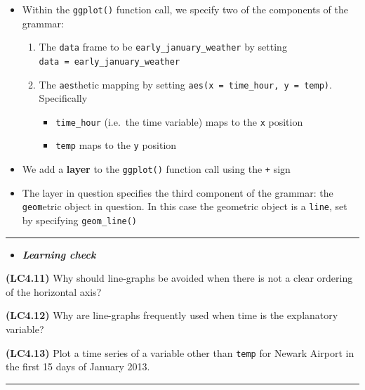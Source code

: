\documentclass[]{tufte-book}
\let\oldrule=\rule
\renewcommand{\rule}[1]{\oldrule{\linewidth}}
\providecommand{\tightlist}{%
  \setlength{\itemsep}{0pt}\setlength{\parskip}{0pt}}
\newenvironment{rmdblock}[1]
  {\begin{shaded*}
  \begin{itemize}
  \renewcommand{\labelitemi}{
    \raisebox{-.7\height}[0pt][0pt]{
    }
  }
  \item
  }
  {
  \end{itemize}
  \end{shaded*}
  }
\newenvironment{learncheck}
  {\begin{rmdblock}{warning}}
  {\end{rmdblock}}
\theoremstyle{definition}
\theoremstyle{definition}
\theoremstyle{remark}
\begin{document}
\begin{itemize}
\tightlist
\item
  Within the \texttt{ggplot()} function call, we specify two of the
  components of the grammar:

  \begin{enumerate}
  \def\labelenumi{\arabic{enumi}.}
  \tightlist
  \item
    The \texttt{data} frame to be \texttt{early\_january\_weather} by
    setting \texttt{data\ =\ early\_january\_weather}
  \item
    The \texttt{aes}thetic mapping by setting
    \texttt{aes(x\ =\ time\_hour,\ y\ =\ temp)}. Specifically

    \begin{itemize}
    \tightlist
    \item
      \texttt{time\_hour} (i.e.~the time variable) maps to the
      \texttt{x} position
    \item
      \texttt{temp} maps to the \texttt{y} position
    \end{itemize}
  \end{enumerate}
\item
  We add a \textbf{layer} to the \texttt{ggplot()} function call using
  the \texttt{+} sign
\item
  The layer in question specifies the third component of the grammar:
  the \texttt{geom}etric object in question. In this case the geometric
  object is a \texttt{line}, set by specifying \texttt{geom\_line()}
\end{itemize}

\begin{center}\rule{0.5\linewidth}{\linethickness}\end{center}

\begin{learncheck}
\textbf{\emph{Learning check}}
\end{learncheck}

\textbf{(LC4.11)} Why should line-graphs be avoided when there is not a
clear ordering of the horizontal axis?

\textbf{(LC4.12)} Why are line-graphs frequently used when time is the
explanatory variable?

\textbf{(LC4.13)} Plot a time series of a variable other than
\texttt{temp} for Newark Airport in the first 15 days of January 2013.

\begin{center}\rule{0.5\linewidth}{\linethickness}\end{center}
\end{document}
